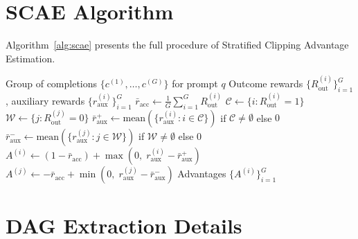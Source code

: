\section{SCAE Algorithm}
\label{app:scae}

Algorithm~\ref{alg:scae} presents the full procedure of Stratified
Clipping Advantage Estimation.

\begin{algorithm}[H]
\caption{Stratified Clipping Advantage Estimation (SCAE)}
\label{alg:scae}
\begin{algorithmic}[1]
\Require Group of completions $\{c^{(1)}, \ldots, c^{(G)}\}$ for prompt $q$
\Require Outcome rewards $\{R_\mathrm{out}^{(i)}\}_{i=1}^G$, auxiliary rewards $\{r_\mathrm{aux}^{(i)}\}_{i=1}^G$
\State $\bar{r}_\mathrm{acc} \leftarrow \frac{1}{G}\sum_{i=1}^G R_\mathrm{out}^{(i)}$
\State $\mathcal{C} \leftarrow \{i : R_\mathrm{out}^{(i)} = 1\}$ 
\State $\mathcal{W} \leftarrow \{j : R_\mathrm{out}^{(j)} = 0\}$ 
\State $\bar{r}_\mathrm{aux}^+ \leftarrow \mathrm{mean}(\{r_\mathrm{aux}^{(i)} : i \in \mathcal{C}\})$ if $\mathcal{C} \neq \emptyset$ else $0$
\State $\bar{r}_\mathrm{aux}^- \leftarrow \mathrm{mean}(\{r_\mathrm{aux}^{(j)} : j \in \mathcal{W}\})$ if $\mathcal{W} \neq \emptyset$ else $0$
    \State $A^{(i)} \leftarrow (1 - \bar{r}_\mathrm{acc}) + \max(0,\; r_\mathrm{aux}^{(i)} - \bar{r}_\mathrm{aux}^+)$
\EndFor
{}
    \State $A^{(j)} \leftarrow -\bar{r}_\mathrm{acc} + \min(0,\; r_\mathrm{aux}^{(j)} - \bar{r}_\mathrm{aux}^-)$
\EndFor
\Return Advantages $\{A^{(i)}\}_{i=1}^G$
\end{algorithmic}
\end{algorithm}

\section{DAG Extraction Details}
\label{app:dag}

